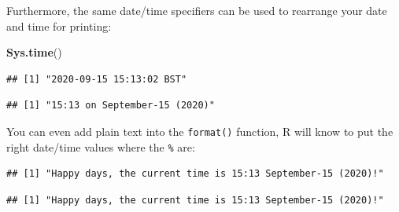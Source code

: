 \documentclass[
  12pt,
  krantz2]{krantz}
\makeatletter
\newenvironment{Shaded}{\begin{snugshade}}{\end{snugshade}}
\newcommand{\KeywordTok}[1]{\textcolor[rgb]{0.13,0.29,0.53}{\textbf{#1}}}
\newcommand{\NormalTok}[1]{#1}
\newcommand{\OperatorTok}[1]{\textcolor[rgb]{0.81,0.36,0.00}{\textbf{#1}}}
\newcommand{\StringTok}[1]{\textcolor[rgb]{0.31,0.60,0.02}{#1}}
\newenvironment{kframe}{%
\medskip{}
\setlength{\fboxsep}{.8em}
 \def\at@end@of@kframe{}%
 \ifinner\ifhmode%
  \def\at@end@of@kframe{\end{minipage}}%
  \begin{minipage}{\columnwidth}%
 \fi\fi%
 \def\FrameCommand##1{\hskip\@totalleftmargin \hskip-\fboxsep
 \colorbox{shadecolor}{##1}\hskip-\fboxsep
     \hskip-\linewidth \hskip-\@totalleftmargin \hskip\columnwidth}%
 \MakeFramed {\advance\hsize-\width
   \@totalleftmargin\z@ \linewidth\hsize
   \@setminipage}}%
 {\par\unskip\endMakeFramed%
 \at@end@of@kframe}
\renewenvironment{Shaded}{\begin{kframe}}{\end{kframe}}
\makeatother
\begin{document}
Furthermore, the same date/time specifiers can be used to rearrange your date and time for printing:

\begin{Shaded}
\begin{Highlighting}[]
\KeywordTok{Sys.time}\NormalTok{()}
\end{Highlighting}
\end{Shaded}

\begin{verbatim}
## [1] "2020-09-15 15:13:02 BST"
\end{verbatim}

\begin{Shaded}
\end{Shaded}

\begin{verbatim}
## [1] "15:13 on September-15 (2020)"
\end{verbatim}

You can even add plain text into the \texttt{format()} function, R will know to put the right date/time values where the \texttt{\%} are:

\begin{Shaded}
\end{Shaded}

\begin{verbatim}
## [1] "Happy days, the current time is 15:13 September-15 (2020)!"
\end{verbatim}

\begin{Shaded}
\end{Shaded}

\begin{verbatim}
## [1] "Happy days, the current time is 15:13 September-15 (2020)!"
\end{verbatim}
\end{document}
